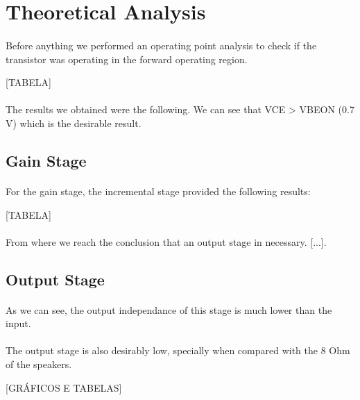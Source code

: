 \section{Theoretical Analysis}
\label{sec:analysis}

\paragraph{} Before anything we performed an operating point analysis to check if the transistor was operating in the forward operating region.

[TABELA]

\paragraph{} The results we obtained were the following. We can see that VCE > VBEON (0.7 V) which is the desirable result.

\subsection{Gain Stage}

\paragraph{} For the gain stage, the incremental stage provided the following results:

[TABELA]

\paragraph{} From where we reach the conclusion that an output stage in necessary. [...].

\subsection{Output Stage}

\paragraph{} As we can see, the output independance of this stage is much lower than the input.

\paragraph{} The output stage is also desirably low, specially when compared with the 8 Ohm of the speakers.

[GRÁFICOS E TABELAS] 

\clearpage